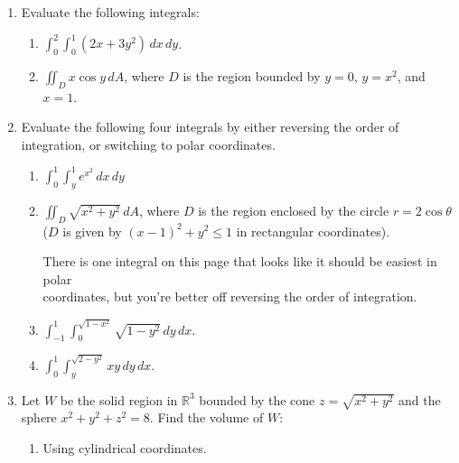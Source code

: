 \documentclass[12pt]{article}
\newcommand{\points}[1]{\marginpar{\hspace{24pt}[#1]}}
\newcommand{\di}{\displaystyle}
\newcommand{\R}{\mathbb{R}}
\begin{document}
\begin{enumerate}
\item Evaluate the following integrals:
\begin{enumerate}
 \item $\di \int_0^2\int_0^1 (2x+3y^2)\,dx\,dy$.\points{5}

\vspace{3in}

 \item $\di \iint_D x\cos y\,dA$, where $D$ is the region bounded by $y=0$, $y=x^2$, and $x=1$.\points{5}
\end{enumerate}
\newpage

\item Evaluate the following four integrals by either reversing the order of integration, or switching to polar coordinates.\\


\begin{enumerate}
 \item $\di \int_0^1\int_{y}^1 e^{x^2}\,dx\,dy$ \points{5}

\vspace{3.5in}

 \item $\di \iint_D\sqrt{x^2+y^2}\,dA$, where $D$ is the region enclosed by the circle $r=2\cos\theta$ \points{5}\\
 ($D$ is given by $(x-1)^2+y^2\leq 1$ in rectangular coordinates).

\newpage
\hspace{-32pt}{\em Hint:} There is one integral on this page that looks like it should be easiest in polar \\coordinates, but you're better off reversing the order of integration.

 \item $\di \int_{-1}^1\int_0^{\sqrt{1-x^2}}\sqrt{1-y^2}\,dy\,dx$.\points{5}

\vspace{4in}

 \item $\di \int_0^1\int_y^{\sqrt{2-y^2}}xy\,dy\,dx$. \points{5}
\end{enumerate}
\newpage

\item Let $W$ be the solid region in $\R^3$ bounded by the cone $z=\sqrt{x^2+y^2}$ and the sphere $x^2+y^2+z^2=8$. Find the volume of $W$:
\begin{enumerate}
 \item Using cylindrical coordinates. \points{5}


\end{enumerate}
\end{enumerate}
\end{document}
